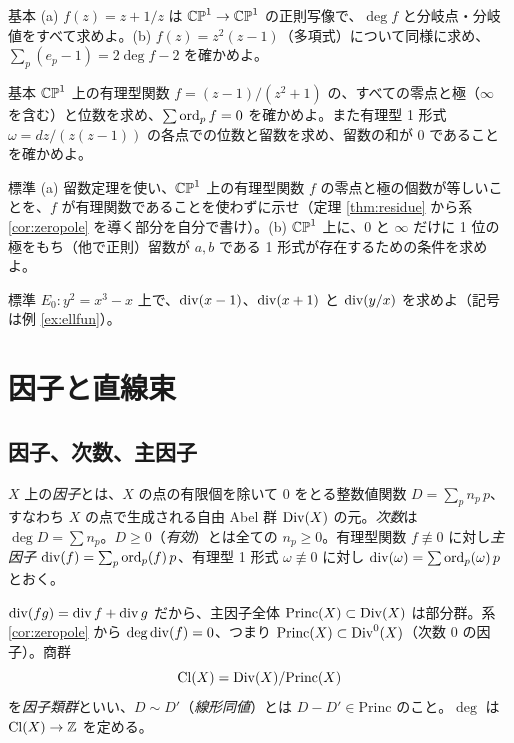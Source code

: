 \begin{prob}{基本}\label{p:local}
(a) $f(z)=z+1/z$ は $\mathbb{CP}^1\to\mathbb{CP}^1$ の正則写像で、$\deg f$ と分岐点・分岐値をすべて求めよ。(b) $f(z)=z^2(z-1)$（多項式）について同様に求め、$\sum_p(e_p-1)=2\deg f-2$ を確かめよ。
\end{prob}
\begin{prob}{基本}\label{p:divP1}
$\mathbb{CP}^1$ 上の有理型関数 $f=(z-1)/(z^2+1)$ の、すべての零点と極（$\infty$ を含む）と位数を求め、$\sum\operatorname{ord}_p f=0$ を確かめよ。また有理型 1 形式 $\omega=dz/(z(z-1))$ の各点での位数と留数を求め、留数の和が $0$ であることを確かめよ。
\end{prob}
\begin{prob}{標準}\label{p:residue}
(a) 留数定理を使い、$\mathbb{CP}^1$ 上の有理型関数 $f$ の零点と極の個数が等しいことを、$f$ が有理関数であることを使わずに示せ（定理 \ref{thm:residue} から系 \ref{cor:zeropole} を導く部分を自分で書け）。(b) $\mathbb{CP}^1$ 上に、$0$ と $\infty$ だけに 1 位の極をもち（他で正則）留数が $a,b$ である 1 形式が存在するための条件を求めよ。
\end{prob}
\begin{prob}{標準}\label{p:ell0}
$E_0:y^2=x^3-x$ 上で、$\operatorname{div}(x-1)$、$\operatorname{div}(x+1)$ と $\operatorname{div}(y/x)$ を求めよ（記号は例 \ref{ex:ellfun}）。
\end{prob}

\section{因子と直線束}\label{sec:div}

\subsection{因子、次数、主因子}
\begin{defn}[因子]
$X$ 上の\emph{因子}とは、$X$ の点の有限個を除いて $0$ をとる整数値関数 $D=\sum_pn_p\,p$、すなわち $X$ の点で生成される自由 Abel 群 $\mathrm{Div}(X)$ の元。\emph{次数}は $\deg D=\sum n_p$。$D\ge0$（\emph{有効}）とは全ての $n_p\ge0$。有理型関数 $f\not\equiv0$ に対し\emph{主因子} $\operatorname{div}(f)=\sum_p\operatorname{ord}_p(f)\,p$、有理型 1 形式 $\omega\not\equiv0$ に対し $\operatorname{div}(\omega)=\sum\operatorname{ord}_p(\omega)\,p$ とおく。
\end{defn}
$\operatorname{div}(fg)=\operatorname{div} f+\operatorname{div} g$ だから、主因子全体 $\mathrm{Princ}(X)\subset\mathrm{Div}(X)$ は部分群。系 \ref{cor:zeropole} から $\deg\operatorname{div}(f)=0$、つまり $\mathrm{Princ}(X)\subset\mathrm{Div}^0(X)$（次数 $0$ の因子）。商群
\[
\mathrm{Cl}(X)=\mathrm{Div}(X)/\mathrm{Princ}(X)
\]
を\emph{因子類群}といい、$D\sim D'$（\emph{線形同値}）とは $D-D'\in\mathrm{Princ}$ のこと。$\deg$ は $\mathrm{Cl}(X)\to\mathbb Z$ を定める。

